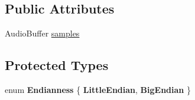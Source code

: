 \subsection*{Public Attributes}
\begin{DoxyCompactItemize}
\item 
Audio\-Buffer \hyperlink{class_audio_file_af937119db095c5af870851050dcbeabb}{samples}
\end{DoxyCompactItemize}
\subsection*{Protected Types}
\begin{DoxyCompactItemize}
\item 
enum {\bfseries Endianness} \{ {\bfseries Little\-Endian}, 
{\bfseries Big\-Endian}
 \}
\end{DoxyCompactItemize}
